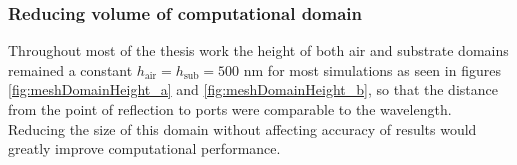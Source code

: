 
\subsubsection*{Reducing volume of computational domain}

Throughout most of the thesis work the height of both air and substrate domains remained a constant $h_\text{air}=h_\text{sub}=500$ nm for most simulations as seen in figures \ref{fig:meshDomainHeight_a} and \ref{fig:meshDomainHeight_b}, so that the distance from the point of reflection to ports were comparable to the wavelength. Reducing the size of this domain without affecting accuracy of results would greatly improve computational performance.

